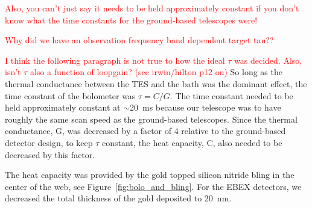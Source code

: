 \textcolor{red}{Also, you can't just say it needs to be held approximately constant if you don't know what the time constants for the ground-based telescopes were!}

\textcolor{red}{Why did we have an observation frequency band dependent target tau??}

\textcolor{red}{I think the following paragraph is not true to how the ideal $\tau$ was decided. Also, isn't $\tau$ also a function of loopgain? (see irwin/hilton p12 on)}
So long as the thermal conductance between the \ac{TES} and the bath was the dominant effect, the time constant of the bolometer was $\tau = C/G$. 
The time constant needed to be held approximately constant at $\sim$20~ms because our telescope was to have roughly the same scan speed as the ground-based telescopes. 
Since the thermal conductance, G, was decreased by a factor of 4 relative to the ground-based detector design, to keep $\tau$ constant, the heat capacity, C, also needed to be decreased by this factor. 

The heat capacity was provided by the gold topped silicon nitride bling in the center of the web, see Figure~\ref{fig:bolo_and_bling}. 
For the \ac{EBEX} detectors, we decreased the total thickness of the gold deposited to 20~nm. 






